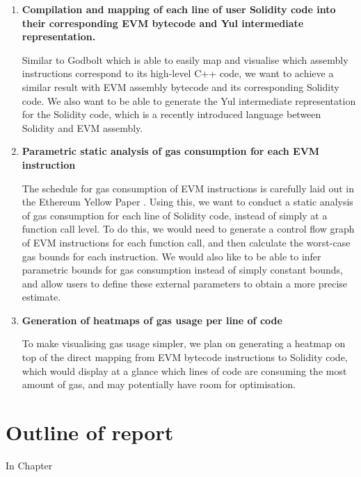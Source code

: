 \begin{enumerate}
    \item \textbf{Compilation and mapping of each line of user Solidity code into their corresponding EVM bytecode and Yul intermediate representation.}
    
      Similar to Godbolt which is able to easily map and visualise which assembly
      instructions correspond to its high-level C++ code, we want to achieve a
      similar result with EVM assembly bytecode and its corresponding Solidity code.
      We also want to be able to generate the Yul intermediate representation for
      the Solidity code, which is a recently introduced language between Solidity
      and EVM assembly.
    \item \textbf{Parametric static analysis of gas consumption for each EVM instruction}
    
      The schedule for gas consumption of EVM instructions is carefully laid out 
      in the Ethereum Yellow Paper \cite{ethereumyellowpaper}. Using this,
      we want to conduct a static analysis of gas consumption for each line
      of Solidity code, instead of simply at a function call level. To do this, we would
      need to generate a control flow graph of EVM instructions for each function call, and then
      calculate the worst-case gas bounds for each instruction. We would also like to
      be able to infer parametric bounds for gas consumption instead of simply
      constant bounds, and allow users to define these external parameters to obtain a 
      more precise estimate.

    \item \textbf{Generation of heatmaps of gas usage per line of code}
    
      To make visualising gas usage simpler, we plan on generating a heatmap on top of
      the direct mapping from EVM bytecode instructions to Solidity code, which would 
      display at a glance which lines of code are consuming the most amount of gas, and 
      may potentially have room for optimisation.

      
      
\end{enumerate}


\section{Outline of report}

In Chapter 